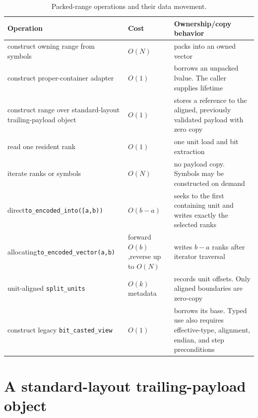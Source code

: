 \newpage
\flushbottom
\begin{table}[H]
\centering
\caption{Packed-range operations and their data movement.}
\label{tab:compact-operation-costs}
\begingroup
\small
\setlength{\tabcolsep}{4pt}
\renewcommand{\arraystretch}{1.08}
\begin{tabularx}{\textwidth}{@{}
  >{\raggedright\arraybackslash}p{}
  >{\raggedright\arraybackslash}p{}
  >{\raggedright\arraybackslash}X@{}}
\textbf{Operation} & \textbf{Cost} & \textbf{Ownership/copy behavior}\\
\hline
construct owning range from symbols & \(O(N)\) & packs into an owned vector\\
construct proper-container adapter & \(O(1)\) & borrows an unpacked lvalue.
The caller supplies lifetime\\
construct range over standard-layout trailing-payload object & \(O(1)\) & stores a reference to
the aligned, previously validated payload with zero copy\\
read one resident rank & \(O(1)\) & one unit load and bit extraction\\
iterate ranks or symbols & \(O(N)\) & no payload copy.  Symbols may be
constructed on demand\\
direct\newline\texttt{to\_encoded\_into}\newline\texttt{([a,b))} &
\(O(b-a)\) & seeks to the first
containing unit and writes exactly the selected ranks\\
allocating\newline\texttt{to\_encoded\_vector}\newline\texttt{(a,b)} &
forward \(O(b)\),\newline reverse up to \(O(N)\) &
writes \(b-a\) ranks after iterator traversal\\
unit-aligned \texttt{split\_units} & \(O(k)\) metadata & records unit offsets.
Only aligned boundaries are zero-copy\\
construct legacy \texttt{bit\_casted\_view} & \(O(1)\) & borrows its base.
Typed use also requires effective-type, alignment, endian, and step
preconditions\\
\end{tabularx}
\endgroup
\end{table}

\section{A standard-layout trailing-payload object}
\label{sec:sequence-stdc}


